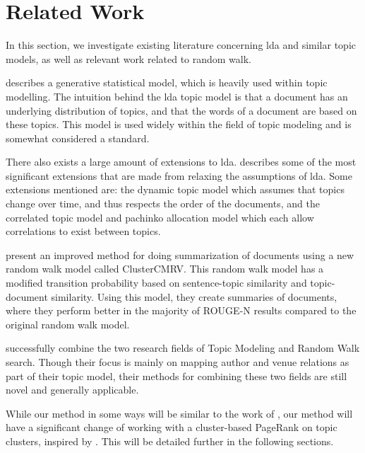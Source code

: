 \section{Related Work}\label{sec:related-works}
In this section, we investigate existing literature concerning \gls{lda} and similar topic models, as well as relevant work related to random walk.

\citet{lda} describes a generative statistical model, which is heavily used within topic modelling. 
The intuition behind the \gls{lda} topic model is that a document has an underlying distribution of topics, and that the words of a document are based on these topics.
This model is used widely within the field of topic modeling and is somewhat considered a standard.

There also exists a large amount of extensions to \gls{lda}.
\citet{blei2012topicmodels} describes some of the most significant extensions that are made from relaxing the assumptions of \gls{lda}.
Some extensions mentioned are: the dynamic topic model\cite{blei2006dynamic} which assumes that topics change over time, and thus respects the order of the documents, and the correlated topic model\cite{blei2007correlated} and pachinko allocation model\cite{li2006pachinko} which each allow correlations to exist between topics.

\citet{ClusterPageRank} present an improved method for doing summarization of documents using a new random walk model called ClusterCMRV. 
This random walk model has a modified transition probability based on sentence-topic similarity and topic-document similarity.
Using this model, they create summaries of documents, where they perform better in the majority of ROUGE-N results compared to the original random walk model.

\citet{Tang2008} successfully combine the two research fields of Topic Modeling and Random Walk search. Though their focus is mainly on mapping author and venue relations as part of their topic model, their methods for combining these two fields are still novel and generally applicable.

While our method in some ways will be similar to the work of \citeauthor{Tang2008}, our method will have a significant change of working with a cluster-based PageRank on topic clusters, inspired by \cite{ClusterPageRank}.
This will be detailed further in the following sections.

